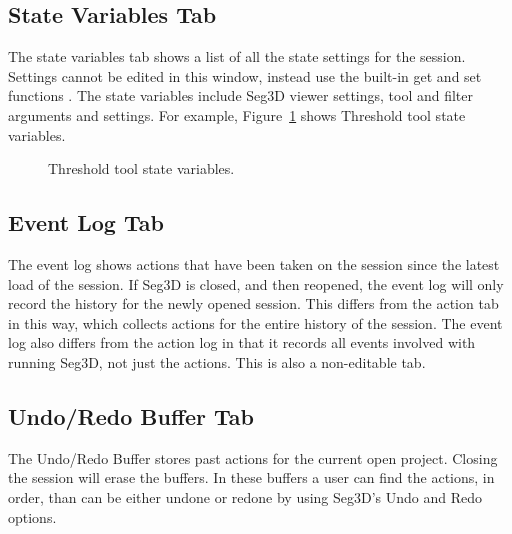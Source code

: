 \documentclass[fleqn,11pt,openany]{book}
\begin{document}
\subsection{State Variables Tab}
The state variables tab  shows a list of all the state settings for the session.
Settings cannot be edited in this window, instead use the built-in get and set functions .
The state variables include Seg3D viewer settings, tool and filter arguments and settings.
For example, Figure~\ref{fig:ToolStateVars} shows Threshold tool state variables.

\begin{figure}[h]
\caption{Threshold tool state variables.}\label{fig:ToolStateVars}
\end{figure}

\subsection{Event Log Tab}
The event log shows actions that have been taken on the session since the latest load of the session.
If Seg3D is closed, and then reopened, the event log will only record the history for the newly opened session.
This differs from the action tab in this way, which collects actions for the entire history of the session.
The event log also differs from the action log in that it records all events involved with running Seg3D, not just the actions.
This is also a non-editable tab.

\subsection{Undo/Redo Buffer Tab}
The Undo/Redo Buffer stores past actions for the current open project.
Closing the session will erase the buffers.
In these buffers a user can find the actions, in order, than can be either undone or redone by using Seg3D's Undo and Redo options.
\end{document}
